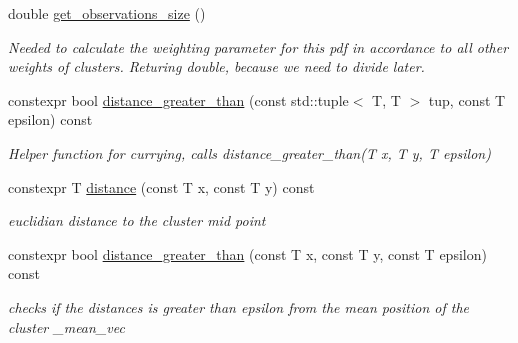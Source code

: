 \begin{DoxyCompactItemize}
\mbox{\label{classclara_1_1cone__state_a939e8407c5c42bbe9c857e9079a41cc2}} 
double \hyperlink{classclara_1_1cone__state_a939e8407c5c42bbe9c857e9079a41cc2}{get\+\_\+observations\+\_\+size} ()
\begin{DoxyCompactList}\small\item\em Needed to calculate the weighting parameter for this pdf in accordance to all other weights of clusters. Returing double, because we need to divide later. \end{DoxyCompactList}\item 
\mbox{\label{classclara_1_1cone__state_aac7c79a85642847ee138fcbaf40ea3f6}} 
constexpr bool \hyperlink{classclara_1_1cone__state_aac7c79a85642847ee138fcbaf40ea3f6}{distance\+\_\+greater\+\_\+than} (const std\+::tuple$<$ T, T $>$ tup, const T epsilon) const
\begin{DoxyCompactList}\small\item\em Helper function for currying, calls distance\+\_\+greater\+\_\+than(\+T x, T y, T epsilon) \end{DoxyCompactList}\item 
\mbox{\label{classclara_1_1cone__state_aea1594d473b810becb527419a8bddbdb}} 
constexpr T \hyperlink{classclara_1_1cone__state_aea1594d473b810becb527419a8bddbdb}{distance} (const T x, const T y) const
\begin{DoxyCompactList}\small\item\em euclidian distance to the cluster mid point \end{DoxyCompactList}\item 
\mbox{\label{classclara_1_1cone__state_a884712e142ddbb9901f708f739eaa8a0}} 
constexpr bool \hyperlink{classclara_1_1cone__state_a884712e142ddbb9901f708f739eaa8a0}{distance\+\_\+greater\+\_\+than} (const T x, const T y, const T epsilon) const
\begin{DoxyCompactList}\small\item\em checks if the distances is greater than epsilon from the mean position of the cluster \+\_\+mean\+\_\+vec \end{DoxyCompactList}\end{DoxyCompactItemize}
